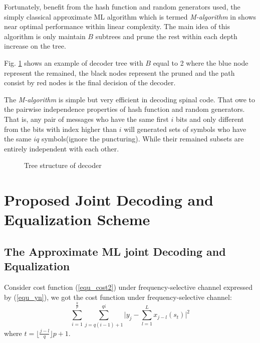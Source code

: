 \documentclass[conference]{IEEEtran}
\begin{document}
Fortunately, benefit from the hash function and random generators used, the simply classical approximate ML algorithm which is termed \textit{M-algorithm} in \cite{Anderson1984} shows near optimal performance within linear complexity. The main idea of this algorithm is only maintain $B$ subtrees and prune the rest within each depth increase on the tree. 

Fig. \ref{fig_decoderTree} shows an example of decoder tree with $B$ equal to 2 where the blue node represent the remained, the black nodes represent the pruned and the path consist by red nodes is the final decision of the decoder.%

The \textit{M-algorithm} is simple but very efficient in decoding spinal code. That owe to the pairwise independence properties of hash function and random generators. That is, any pair of messages who have the same first $i$ bits and only different from the bits with index higher than $i$ will generated sets of symbols who have the same $iq$ symbols(ignore the puncturing). While their remained subsets are entirely independent with each other.
\begin{figure}
\centering
{}
\caption{Tree structure of decoder}
\label{fig_decoderTree}
\end{figure}
\section{Proposed Joint Decoding and Equalization Scheme}
\subsection{The Approximate ML joint Decoding and Equalization}
Consider cost function (\ref{equ_cost2}) under frequency-selective channel expressed by (\ref{equ_yn}), we got the cost function under frequency-selective channel:
\begin{equation}
\sum_{i=1}^{\frac{k}{p}}\sum_{j=q(i-1)+1}^{qi}\vert y_{j}-\sum_{l=1}^L x_{j-l}(s_{t})\vert^2
\label{equ_costEqu}
\end{equation}
where $t=\lfloor\frac{j-l}{q}\rfloor p+1$.
\end{document}
